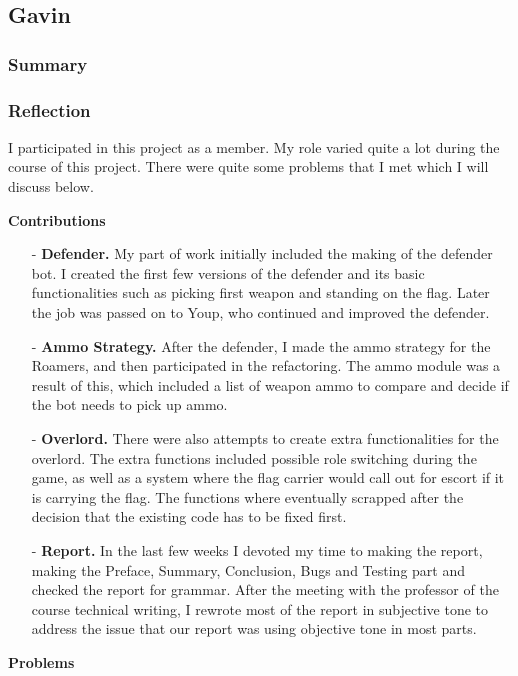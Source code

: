 \newpage
\subsection{Gavin}
\subsubsection{Summary}
\subsubsection{Reflection}
I participated in this project as a member. My role varied quite a lot during the course of this project. There were quite some problems that I met which I will discuss below.

\noindent
\textbf{Contributions}
\begin{itemize}
\item[-] \textbf{Defender.}
My part of work initially included the making of the defender bot. I created the first few versions of the defender and its basic functionalities such as picking first weapon and standing on the flag. Later the job was passed on to Youp, who continued and improved the defender.
\item[-] \textbf{Ammo Strategy.}
After the defender, I made the ammo strategy for the Roamers, and then participated in the refactoring. The ammo module was a result of this, which included a list of weapon ammo to compare and decide if the bot needs to pick up ammo.
\item[-] \textbf{Overlord.}
There were also attempts to create extra functionalities for the overlord. The extra functions included possible role switching during the game, as well as a system where the flag carrier would call out for escort if it is carrying the flag. The functions where eventually scrapped after the decision that the existing code has to be fixed first.
\item[-] \textbf{Report.}
In the last few weeks I devoted my time to making the report, making the Preface, Summary, Conclusion, Bugs and Testing part and checked the report for grammar. After the meeting with the professor of the course technical writing, I rewrote most of the report in subjective tone to address the issue that our report was using objective tone in most parts.
\end{itemize}
\noindent
\textbf{Problems}
